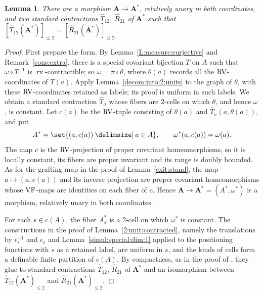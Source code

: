 \documentclass[12pt]{amsart}
\theoremstyle{plain}
\newtheorem{lem}[thm]{Lemma}
\theoremstyle{definition}
\theoremstyle{remark}
\numberwithin{equation}{section}
\theoremstyle{plain}
\newcommand{\VF}{\textup{VF}}
\newcommand{\RV}{\textup{RV}}
\newcommand{\0}{\emptyset}
\newcommand{\fun}{\longrightarrow}
\newcommand{\efun}{\longmapsto}
\providecommand\given{}
\newcommand\SetSymbol[1][]{%
\nonscript \: #1 \vert
\allowbreak
\nonscript\:
\mathopen{}}
\renewcommand\given{\SetSymbol[\delimsize]}
\DeclareMathOperator{\rv}{rv}
\begin{document}
\begin{lem}\label{subset:partitioned:2:unit:contracted}
There are a morphism $\bm A \fun \bm A^*$, relatively unary in both coordinates, and two standard contractions $\hat T_{12}$, $\hat R_{21}$ of $\bm A^*$ such that $[\hat T_{12}(\bm A^*)]_{\leq 2} = [\hat R_{21}(\bm A^*)]_{\leq 2}$.
\end{lem}
\begin{proof}
First prepare the form. By Lemma~\ref{L:measure:surjective} and Remark~\ref{cons:extra}, there is a special covariant bijection $T$ on $A$ such that $\omega \circ T^{-1}$ is $\rv$-contractible; so $\omega = \pi \circ \theta$, where $\theta(a)$ records all the $\RV$-coordinates of $T(a)$. Apply Lemma~\ref{decom:into:2:units} to the graph of $\theta$, with these $\RV$-coordinates retained as labels; its proof is uniform in such labels. We obtain a standard contraction $\hat T_\sigma$ whose fibers are $2$-cells on which $\theta$, and hence $\omega$, is constant. Let $c(a)$ be the $\RV$-tuple consisting of $\theta(a)$ and $\hat T_\sigma(a, \theta(a))$, and put
\[
A^* = \set{(a, c(a)) \given a \in A}, \qquad \omega^*(a, c(a)) = \omega(a).
\]
The map $c$ is the $\RV$-projection of proper covariant homeomorphisms, so it is locally constant, its fibers are proper invariant and its range is doubly bounded. As for the grafting map in the proof of Lemma~\ref{exit:stand}, the map $a \efun (a, c(a))$ and its inverse projection are proper covariant homeomorphisms whose $\VF$-maps are identities on each fiber of $c$. Hence $\bm A \fun \bm A^* = (A^*, \omega^*)$ is a morphism, relatively unary in both coordinates.

For each $s \in c(A)$, the fiber $A^*_s$ is a $2$-cell on which $\omega^*$ is constant. The constructions in the proof of Lemma~\ref{2:unit:contracted}, namely the translations by $\epsilon_s^{-1}$ and $\epsilon_s$ and Lemma~\ref{simul:special:dim:1} applied to the positioning functions with $s$ as a retained label, are uniform in $s$, and the kinds of cells form a definable finite partition of $c(A)$. By compactness, as in the proof of \cite[Corollary~5.8]{Yin:int:acvf}, they glue to standard contractions $\hat T_{12}$, $\hat R_{21}$ of $\bm A^*$ and an isomorphism between $\hat T_{12}(\bm A^*)_{\leq 2}$ and $\hat R_{21}(\bm A^*)_{\leq 2}$.
\end{proof}
\end{document}
